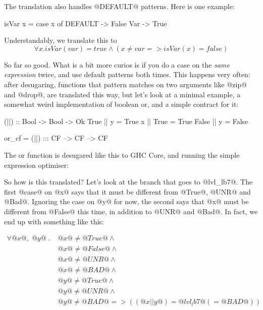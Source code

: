 
The translation also handles @DEFAULT@ patterns. Here is one example:

\begin{code}
isVar x = case x of
    DEFAULT -> False
    Var     -> True
\end{code}

Understandably, we translate this to
$$\forall x . isVar(var) = true \land (x \neq var => isVar(x) = false)$$

So far so good. What is a bit more curios is if you do a case on the
\emph{same expression} twice, and use default patterns both times.
This happens very often: after desugaring, functions that pattern matches
on two arguments like @zip@ and @drop@, are translated this way, but let's
look at a minimal example, a somewhat weird implementation of boolean or,
and a simple contract for it:

\begin{code}
(||) :: Bool -> Bool -> Ok
True  || y    = True
x     || True = True
False || y    = False

or_cf = (||) ::: CF --> CF --> CF
\end{code}

The or function is desugared like this to GHC Core, and running
the simple expression optimiser:

So how is this translated? Let's look at the branch that goes to
@lvl_lb7@. The first @case@ on @x@ says that it must be different from
@True@, @UNR@ and @Bad@. Ignoring the case on @y@ for now, the second
says that @x@ must be different from @False@ this time, in addition to
@UNR@ and @Bad@. In fact, we end up with something like this:

\[\begin{array}{rl}
\forall @x@ , \; @y@ \; . \;
    & @x@ \neq @True@ \land \\
    & @x@ \neq @False@ \land \\
    & @x@ \neq @UNR@ \land \\
    & @x@ \neq @BAD@ \land \\
    & @y@ \neq @True@ \land \\
    & @y@ \neq @UNR@ \land \\
    & @y@ \neq @BAD@ => ((@x || y@) = @lvl_lb7@ (= @BAD@))
\end{array}\]

